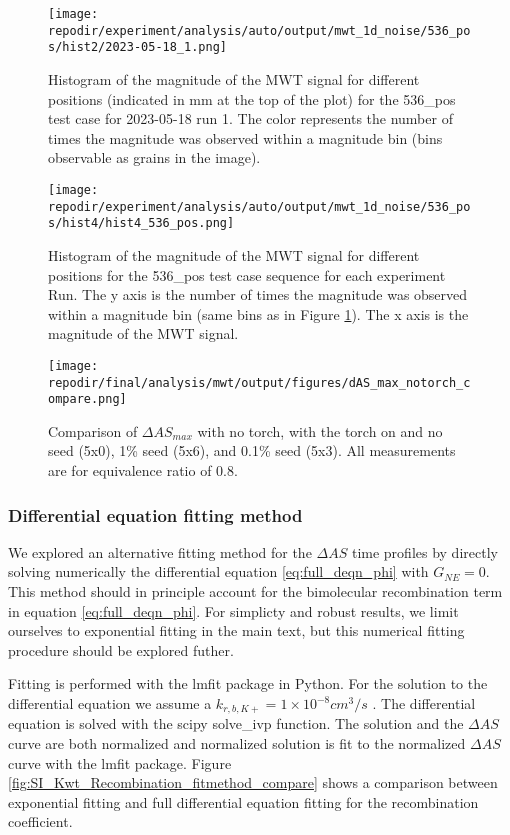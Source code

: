 \begin{figure}
    \centering
    \texttt{[image: \\repodir/experiment/analysis/auto/output/mwt\_1d\_noise/536\_pos/hist2/2023-05-18\_1.png]} 
    \caption{Histogram of the magnitude of the MWT signal for different positions (indicated in mm at the top of the plot) for the 536\_pos test case for 2023-05-18 run 1. The color represents the number of times the magnitude was observed within a magnitude bin (bins observable as grains in the image). }
    \label{fig:SI_mwt_1d_noise_536_pos_hist2_2023-05-18_1}
\end{figure}

\begin{figure}
    \centering
    \texttt{[image: \\repodir/experiment/analysis/auto/output/mwt\_1d\_noise/536\_pos/hist4/hist4\_536\_pos.png]} 
    \caption{Histogram of the magnitude of the MWT signal for different positions for the 536\_pos test case sequence for each experiment Run. The y axis is the number of times the magnitude was observed within a magnitude bin (same bins as in Figure \ref{fig:SI_mwt_1d_noise_536_pos_hist2_2023-05-18_1}). The x axis is the magnitude of the MWT signal.}
    \label{fig:SI_mwt_1d_noise_536_pos_hist4_hist4_536_pos}
\end{figure}

\begin{figure}[]
\centering
\texttt{[image: \\repodir/final/analysis/mwt/output/figures/dAS\_max\_notorch\_compare.png]}
\caption{Comparison of $\Delta AS_{max}$ with no torch, with the torch on and no seed (5x0), 1\% seed (5x6), and 0.1\% seed (5x3).  All measurements are for equivalence ratio of 0.8.}
\end{figure}

\label{sec:mwt-diff-eq-fitting}
\subsubsection{Differential equation fitting method }

We explored an alternative fitting method for the $\Delta AS$ time profiles by directly solving numerically the differential equation \ref{eq:full_deqn_phi} with $G_{NE} =0$. This method should in principle account for the bimolecular recombination term in equation \ref{eq:full_deqn_phi}. For simplicty and robust results, we limit ourselves to exponential fitting in the main text, but this numerical fitting procedure should be explored futher. 

Fitting is performed with the lmfit package in Python. For the solution to the differential equation we assume a $k_{r,b,K+} = 1 \times 10^{-8} cm^3/s$ . The differential equation is solved with the scipy solve\_ivp function. The solution and the $\Delta AS$ curve are both normalized and normalized solution is fit to the normalized $\Delta AS$ curve with the lmfit package. Figure \ref{fig:SI_Kwt_Recombination_fitmethod_compare} shows a comparison between exponential fitting and full differential equation fitting for the recombination coefficient. 

